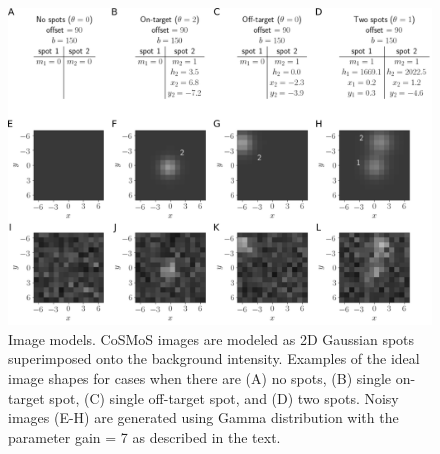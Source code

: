 \begin{figure}
\includegraphics[width=\linewidth]{figures/figure2/figure2.png}
\caption{Image models. CoSMoS images are modeled as 2D Gaussian spots superimposed onto the background intensity. Examples of the ideal image shapes for cases when there are (A) no spots, (B) single on-target spot, (C) single off-target spot, and (D) two spots. Noisy images (E-H) are generated using Gamma distribution with the parameter gain = 7 as described in the text.}
\label{fig:model}
\end{figure}

